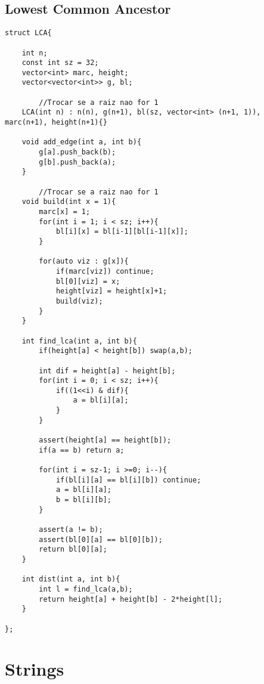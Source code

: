 \documentclass[11pt, a4paper, twoside]{article}
\begin{document}
\subsection{Lowest Common Ancestor}
\begin{verbatim}
struct LCA{
        
    int n;
    const int sz = 32;
    vector<int> marc, height;
    vector<vector<int>> g, bl;
    
        //Trocar se a raiz nao for 1
    LCA(int n) : n(n), g(n+1), bl(sz, vector<int> (n+1, 1)), marc(n+1), height(n+1){}
    
    void add_edge(int a, int b){
        g[a].push_back(b);
        g[b].push_back(a);
    }
    
        //Trocar se a raiz nao for 1
    void build(int x = 1){ 
        marc[x] = 1;
        for(int i = 1; i < sz; i++){
            bl[i][x] = bl[i-1][bl[i-1][x]];
        }
    
        for(auto viz : g[x]){
            if(marc[viz]) continue;
            bl[0][viz] = x;
            height[viz] = height[x]+1;
            build(viz);
        }
    }
    
    int find_lca(int a, int b){
        if(height[a] < height[b]) swap(a,b);
    
        int dif = height[a] - height[b];
        for(int i = 0; i < sz; i++){
            if((1<<i) & dif){
                a = bl[i][a];
            }
        }
    
        assert(height[a] == height[b]);
        if(a == b) return a;
    
        for(int i = sz-1; i >=0; i--){
            if(bl[i][a] == bl[i][b]) continue;
            a = bl[i][a];
            b = bl[i][b];
        }
            
        assert(a != b);
        assert(bl[0][a] == bl[0][b]);
        return bl[0][a];
    }
    
    int dist(int a, int b){
        int l = find_lca(a,b);  
        return height[a] + height[b] - 2*height[l];
    }
    
};
\end{verbatim}



%
%

\section{Strings}
\end{document}
